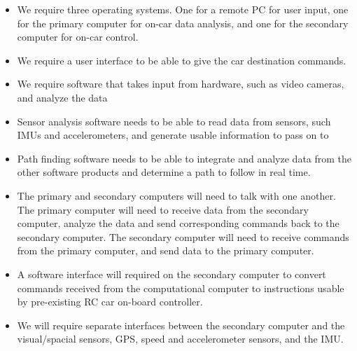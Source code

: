 \documentclass[compsoc,draftclsnofoot,onecolumn,10pt]{IEEEtran}
\begin{document}
\begin{itemize}
	
	\item We require three operating systems. One for a remote PC for user input, one
	for the primary computer for on-car data analysis, and one for the secondary
	computer for on-car control.
	
	\item We require a user interface to be able to give the car destination commands. 
	
	\item We require software that takes input from hardware, such as video cameras,
	and analyze the data 
	
	\item Sensor analysis software needs to be able to read data from sensors, such IMUs
	and accelerometers, and generate usable information to pass on to 
	
	\item Path finding software needs to be able to integrate and analyze data from the
	other software products and determine a path to follow in real time.
	
	\item The primary and secondary computers will need to talk with one another. The
	primary computer will need to receive data from the secondary computer,
	analyze the data and send corresponding commands back to the secondary
	computer. The secondary computer will need to receive commands from the
	primary computer, and send data to the primary computer.
	
	\item A software interface will required on the secondary computer to convert
	commands received from the computational computer to instructions usable by
	pre-existing RC car on-board controller.
	
	\item We will require separate interfaces between the secondary computer and the
	visual/spacial sensors, GPS, speed and accelerometer sensors, and the IMU. 
	
\end{itemize}
\end{document}
